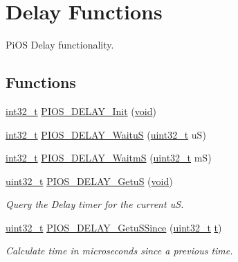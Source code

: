 \hypertarget{group___p_i_o_s___d_e_l_a_y}{\section{Delay Functions}
\label{group___p_i_o_s___d_e_l_a_y}
}


Pi\-O\-S Delay functionality.  


\subsection*{Functions}
\begin{DoxyCompactItemize}
\item 
\hyperlink{group___n_a_m_e_gafd12020da5a235dfcf0c3c748fb5baed}{int32\-\_\-t} \hyperlink{group___p_i_o_s___d_e_l_a_y_ga0d086bac039cb8236edb457b7d4da0fa}{P\-I\-O\-S\-\_\-\-D\-E\-L\-A\-Y\-\_\-\-Init} (\hyperlink{group___n_a_m_e_ga18028b8badbf1ea7e704ccac3c488e82}{void})
\item 
\hyperlink{group___n_a_m_e_gafd12020da5a235dfcf0c3c748fb5baed}{int32\-\_\-t} \hyperlink{group___p_i_o_s___d_e_l_a_y_ga70d41fcf58bbbd18a9b6cd365d0f2dab}{P\-I\-O\-S\-\_\-\-D\-E\-L\-A\-Y\-\_\-\-Waitu\-S} (\hyperlink{stdint_8h_a435d1572bf3f880d55459d9805097f62}{uint32\-\_\-t} u\-S)
\item 
\hyperlink{group___n_a_m_e_gafd12020da5a235dfcf0c3c748fb5baed}{int32\-\_\-t} \hyperlink{group___p_i_o_s___d_e_l_a_y_gacde17b263c115e410008da1357dd4ff8}{P\-I\-O\-S\-\_\-\-D\-E\-L\-A\-Y\-\_\-\-Waitm\-S} (\hyperlink{stdint_8h_a435d1572bf3f880d55459d9805097f62}{uint32\-\_\-t} m\-S)
\item 
\hyperlink{stdint_8h_a435d1572bf3f880d55459d9805097f62}{uint32\-\_\-t} \hyperlink{group___p_i_o_s___d_e_l_a_y_ga2bf95c0ee53ebb01adb2a57c0c25a061}{P\-I\-O\-S\-\_\-\-D\-E\-L\-A\-Y\-\_\-\-Getu\-S} (\hyperlink{group___n_a_m_e_ga18028b8badbf1ea7e704ccac3c488e82}{void})
\begin{DoxyCompactList}\small\item\em Query the Delay timer for the current u\-S. \end{DoxyCompactList}\item 
\hyperlink{stdint_8h_a435d1572bf3f880d55459d9805097f62}{uint32\-\_\-t} \hyperlink{group___p_i_o_s___d_e_l_a_y_gaf474339ea05285a6a4fe90ff4328893b}{P\-I\-O\-S\-\_\-\-D\-E\-L\-A\-Y\-\_\-\-Getu\-S\-Since} (\hyperlink{stdint_8h_a435d1572bf3f880d55459d9805097f62}{uint32\-\_\-t} \hyperlink{pios__opahrs__proto_8h_a9dcbdb7ee917d3a8b4c206575187b1d9}{t})
\begin{DoxyCompactList}\small\item\em Calculate time in microseconds since a previous time. \end{DoxyCompactList}\item 

\end{DoxyCompactItemize}
